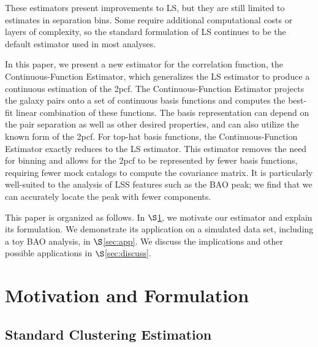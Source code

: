 \documentclass[modern]{aastex62}
\newcommand{\cf}{2pcf\xspace} %
\newcommand{\Est}{The Continuous-Function Estimator\xspace}
\newcommand{\est}{the Continuous-Function Estimator\xspace}
\newcommand{\LS}{LS\xspace}
\begin{document}
These estimators present improvements to \LS, but they are still limited to estimates in separation bins.
Some require additional computational costs or layers of complexity, so the standard formulation of \LS continues to be the default estimator used in most analyses.

In this paper, we present a new estimator for the correlation function, \est, which generalizes the \LS estimator to produce a continuous estimation of the \cf. 
\Est projects the galaxy pairs onto a set of continuous basis functions and computes the best-fit linear combination of these functions.
The basis representation can depend on the pair separation as well as other desired properties, and can also utilize the known form of the \cf.
For top-hat basis functions, \est exactly reduces to the \LS estimator. 
This estimator removes the need for binning and allows for the \cf to be represented by fewer basis functions, requiring fewer mock catalogs to compute the covariance matrix.
It is particularly well-suited to the analysis of LSS features such as the BAO peak; we find that we can accurately locate the peak with fewer components.

This paper is organized as follows. 
In $\S$\ref{sec:motiv}, we motivate our estimator and explain its formulation.
We demonstrate its application on a simulated data set, including a toy BAO analysis, in $\S$\ref{sec:app}.
We discuss the implications and other possible applications in $\S$\ref{sec:discuss}. 

\section{Motivation and Formulation} 
\label{sec:motiv}

\subsection{Standard Clustering Estimation}
\end{document}
